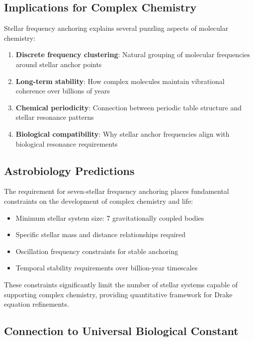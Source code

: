 \documentclass[twocolumn,showpacs,preprintnumbers,amsmath,amssymb]{revtex4-2}
\begin{document}
\subsection{Implications for Complex Chemistry}

Stellar frequency anchoring explains several puzzling aspects of molecular chemistry:

\begin{enumerate}
\item \textbf{Discrete frequency clustering}: Natural grouping of molecular frequencies around stellar anchor points
\item \textbf{Long-term stability}: How complex molecules maintain vibrational coherence over billions of years
\item \textbf{Chemical periodicity}: Connection between periodic table structure and stellar resonance patterns
\item \textbf{Biological compatibility}: Why stellar anchor frequencies align with biological resonance requirements
\end{enumerate}

\subsection{Astrobiology Predictions}

The requirement for seven-stellar frequency anchoring places fundamental constraints on the development of complex chemistry and life:

\begin{itemize}
\item Minimum stellar system size: 7 gravitationally coupled bodies
\item Specific stellar mass and distance relationships required
\item Oscillation frequency constraints for stable anchoring
\item Temporal stability requirements over billion-year timescales
\end{itemize}

These constraints significantly limit the number of stellar systems capable of supporting complex chemistry, providing quantitative framework for Drake equation refinements.

\subsection{Connection to Universal Biological Constant}
\end{document}

